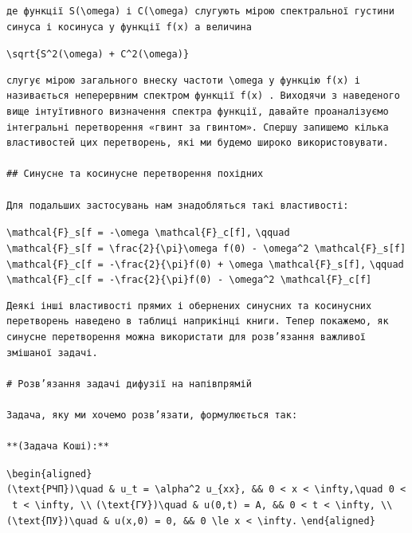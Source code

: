 \documentclass[
  ukrainian,
]{article}
\begin{document}
\begin{verbatim}
де функції S(\omega) і C(\omega) слугують мірою спектральної густини синуса і косинуса у функції f(x) а величина
\end{verbatim}

\texttt{\textbackslash{}sqrt\{S\^{}2(\textbackslash{}omega)\ +\ C\^{}2(\textbackslash{}omega)\}}

\begin{verbatim}
слугує мірою загального внеску частоти \omega у функцію f(x) і називається неперервним спектром функції f(x) . Виходячи з наведеного вище інтуїтивного визначення спектра функції, давайте проаналізуємо інтегральні перетворення «гвинт за гвинтом». Спершу запишемо кілька властивостей цих перетворень, які ми будемо широко використовувати.

## Синусне та косинусне перетворення похідних

Для подальших застосувань нам знадобляться такі властивості:
\end{verbatim}

\texttt{\textbackslash{}mathcal\{F\}\_s{[}f\textquotesingle{}{]}\ =\ -\textbackslash{}omega\ \textbackslash{}mathcal\{F\}\_c{[}f{]},}
\texttt{\textbackslash{}qquad}
\texttt{\textbackslash{}mathcal\{F\}\_s{[}f\textquotesingle{}\textquotesingle{}{]}\ =\ \textbackslash{}frac\{2\}\{\textbackslash{}pi\}\textbackslash{}omega\ f(0)\ -\ \textbackslash{}omega\^{}2\ \textbackslash{}mathcal\{F\}\_s{[}f{]}}
\texttt{\textbackslash{}mathcal\{F\}\_c{[}f\textquotesingle{}{]}\ =\ -\textbackslash{}frac\{2\}\{\textbackslash{}pi\}f(0)\ +\ \textbackslash{}omega\ \textbackslash{}mathcal\{F\}\_s{[}f{]},}
\texttt{\textbackslash{}qquad}
\texttt{\textbackslash{}mathcal\{F\}\_c{[}f\textquotesingle{}\textquotesingle{}{]}\ =\ -\textbackslash{}frac\{2\}\{\textbackslash{}pi\}f\textquotesingle{}(0)\ -\ \textbackslash{}omega\^{}2\ \textbackslash{}mathcal\{F\}\_c{[}f{]}}

\begin{verbatim}
Деякі інші властивості прямих і обернених синусних та косинусних перетворень наведено в таблиці наприкінці книги. Тепер покажемо, як синусне перетворення можна використати для розв’язання важливої змішаної задачі.

# Розв’язання задачі дифузії на напівпрямій

Задача, яку ми хочемо розв’язати, формулюється так:

**(Задача Коші):**
\end{verbatim}

\texttt{\textbackslash{}begin\{aligned\}}
\texttt{(\textbackslash{}text\{РЧП\})\textbackslash{}quad\ \&\ u\_t\ =\ \textbackslash{}alpha\^{}2\ u\_\{xx\},\ \&\&\ 0\ \textless{}\ x\ \textless{}\ \textbackslash{}infty,\textbackslash{}quad\ 0\ \textless{}\ t\ \textless{}\ \textbackslash{}infty,\ \textbackslash{}\textbackslash{}}
\texttt{(\textbackslash{}text\{ГУ\})\textbackslash{}quad\ \&\ u(0,t)\ =\ A,\ \&\&\ 0\ \textless{}\ t\ \textless{}\ \textbackslash{}infty,\ \textbackslash{}\textbackslash{}}
\texttt{(\textbackslash{}text\{ПУ\})\textbackslash{}quad\ \&\ u(x,0)\ =\ 0,\ \&\&\ 0\ \textbackslash{}le\ x\ \textless{}\ \textbackslash{}infty.}
\texttt{\textbackslash{}end\{aligned\}}
\end{document}
